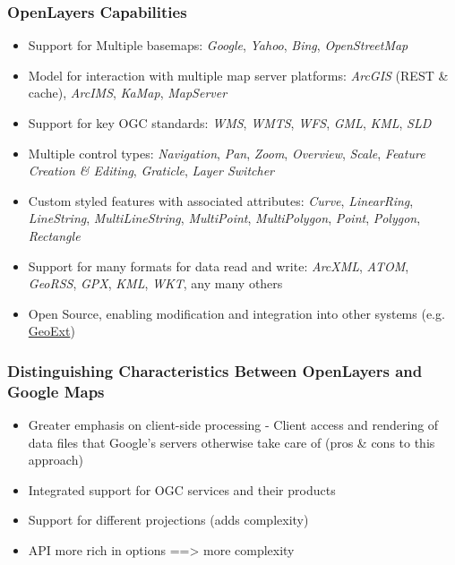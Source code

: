 \documentclass[]{article}
\begin{document}
\subsubsection{OpenLayers Capabilities}\label{openlayers-capabilities}

\begin{itemize}
\itemsep1pt\parskip0pt
\item
  Support for Multiple basemaps: \emph{Google}, \emph{Yahoo},
  \emph{Bing}, \emph{OpenStreetMap}
\item
  Model for interaction with multiple map server platforms:
  \emph{ArcGIS} (REST \& cache), \emph{ArcIMS}, \emph{KaMap},
  \emph{MapServer}
\item
  Support for key OGC standards: \emph{WMS}, \emph{WMTS}, \emph{WFS},
  \emph{GML}, \emph{KML}, \emph{SLD}
\item
  Multiple control types: \emph{Navigation}, \emph{Pan}, \emph{Zoom},
  \emph{Overview}, \emph{Scale}, \emph{Feature Creation \& Editing},
  \emph{Graticle}, \emph{Layer Switcher}
\item
  Custom styled features with associated attributes: \emph{Curve},
  \emph{LinearRing}, \emph{LineString}, \emph{MultiLineString},
  \emph{MultiPoint}, \emph{MultiPolygon}, \emph{Point}, \emph{Polygon},
  \emph{Rectangle}
\item
  Support for many formats for data read and write: \emph{ArcXML},
  \emph{ATOM}, \emph{GeoRSS}, \emph{GPX}, \emph{KML}, \emph{WKT}, any
  many others
\item
  Open Source, enabling modification and integration into other systems
  (e.g. \href{http://geoext.org/}{GeoExt})
\end{itemize}

\subsubsection{Distinguishing Characteristics Between OpenLayers and
Google
Maps}\label{distinguishing-characteristics-between-openlayers-and-google-maps}

\begin{itemize}
\itemsep1pt\parskip0pt
\item
  Greater emphasis on client-side processing - Client access and
  rendering of data files that Google's servers otherwise take care of
  (pros \& cons to this approach)
\item
  Integrated support for OGC services and their products
\item
  Support for different projections (adds complexity)
\item
  API more rich in options ==\textgreater{} more complexity
\end{itemize}
\end{document}
